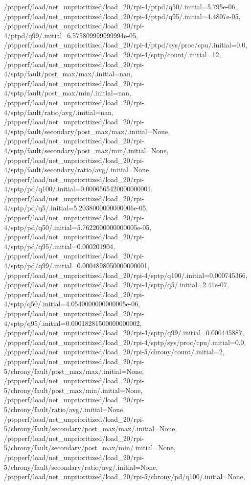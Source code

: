 {    /ptpperf/load/net_unprioritized/load_20/rpi-4/ptpd/q50/.initial=5.795e-06,
    /ptpperf/load/net_unprioritized/load_20/rpi-4/ptpd/q95/.initial=4.4807e-05,
    /ptpperf/load/net_unprioritized/load_20/rpi-4/ptpd/q99/.initial=6.575809999999994e-05,
    /ptpperf/load/net_unprioritized/load_20/rpi-4/ptpd/sys/proc/cpu/.initial=0.0,
    /ptpperf/load/net_unprioritized/load_20/rpi-4/sptp/count/.initial=12,
    /ptpperf/load/net_unprioritized/load_20/rpi-4/sptp/fault/post_max/max/.initial=nan,
    /ptpperf/load/net_unprioritized/load_20/rpi-4/sptp/fault/post_max/min/.initial=nan,
    /ptpperf/load/net_unprioritized/load_20/rpi-4/sptp/fault/ratio/avg/.initial=nan,
    /ptpperf/load/net_unprioritized/load_20/rpi-4/sptp/fault/secondary/post_max/max/.initial=None,
    /ptpperf/load/net_unprioritized/load_20/rpi-4/sptp/fault/secondary/post_max/min/.initial=None,
    /ptpperf/load/net_unprioritized/load_20/rpi-4/sptp/fault/secondary/ratio/avg/.initial=None,
    /ptpperf/load/net_unprioritized/load_20/rpi-4/sptp/pd/q100/.initial=0.0006565420000000001,
    /ptpperf/load/net_unprioritized/load_20/rpi-4/sptp/pd/q5/.initial=5.2038000000000006e-05,
    /ptpperf/load/net_unprioritized/load_20/rpi-4/sptp/pd/q50/.initial=5.7622000000000005e-05,
    /ptpperf/load/net_unprioritized/load_20/rpi-4/sptp/pd/q95/.initial=0.000201904,
    /ptpperf/load/net_unprioritized/load_20/rpi-4/sptp/pd/q99/.initial=0.0004898050000000001,
    /ptpperf/load/net_unprioritized/load_20/rpi-4/sptp/q100/.initial=0.000745366,
    /ptpperf/load/net_unprioritized/load_20/rpi-4/sptp/q5/.initial=2.41e-07,
    /ptpperf/load/net_unprioritized/load_20/rpi-4/sptp/q50/.initial=4.0540000000000005e-06,
    /ptpperf/load/net_unprioritized/load_20/rpi-4/sptp/q95/.initial=0.00018281500000000002,
    /ptpperf/load/net_unprioritized/load_20/rpi-4/sptp/q99/.initial=0.000445887,
    /ptpperf/load/net_unprioritized/load_20/rpi-4/sptp/sys/proc/cpu/.initial=0.0,
    /ptpperf/load/net_unprioritized/load_20/rpi-5/chrony/count/.initial=2,
    /ptpperf/load/net_unprioritized/load_20/rpi-5/chrony/fault/post_max/max/.initial=None,
    /ptpperf/load/net_unprioritized/load_20/rpi-5/chrony/fault/post_max/min/.initial=None,
    /ptpperf/load/net_unprioritized/load_20/rpi-5/chrony/fault/ratio/avg/.initial=None,
    /ptpperf/load/net_unprioritized/load_20/rpi-5/chrony/fault/secondary/post_max/max/.initial=None,
    /ptpperf/load/net_unprioritized/load_20/rpi-5/chrony/fault/secondary/post_max/min/.initial=None,
    /ptpperf/load/net_unprioritized/load_20/rpi-5/chrony/fault/secondary/ratio/avg/.initial=None,
    /ptpperf/load/net_unprioritized/load_20/rpi-5/chrony/pd/q100/.initial=None,
}
